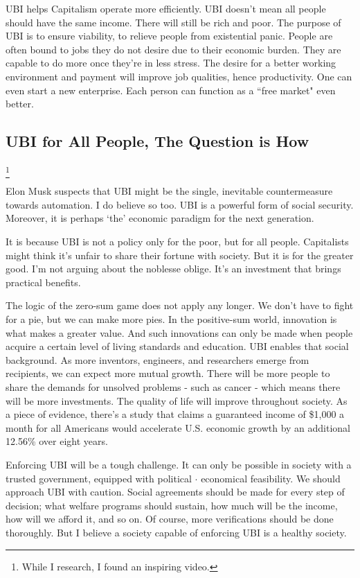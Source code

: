 \documentclass[10pt,a4paper]{article}
\begin{document}
	UBI helps Capitalism operate more efficiently. UBI doesn't mean all people should have the same income. There will still be rich and poor. The purpose of UBI is to ensure viability, to relieve people from existential panic. People are often bound to jobs they do not desire due to their economic burden. They are capable to do more once they're in less stress. The desire for a better working environment and payment will improve job qualities, hence productivity. One can even start a new enterprise. Each person can function as a ``free market" even better.
	
	\subsection*{UBI for All People, The Question is How}\footnote{While I research, I found an inspiring video.\cite{ego}}
	
	Elon Musk suspects that UBI might be the single, inevitable countermeasure towards automation.\cite{musk} I do believe so too. UBI is a powerful form of social security. Moreover, it is perhaps `the' economic paradigm for the next generation.
	
	It is because UBI is not a policy only for the poor, but for all people. Capitalists might think it's unfair to share their fortune with society. But it is for the greater good. I'm not arguing about the noblesse oblige. It's an investment that brings practical benefits.
	
	The logic of the zero-sum game does not apply any longer. We don't have to fight for a pie, but we can make more pies. In the positive-sum world, innovation is what makes a greater value. And such innovations can only be made when people acquire a certain level of living standards and education. UBI enables that social background. As more inventors, engineers, and researchers emerge from recipients, we can expect more mutual growth. There will be more people to share the demands for unsolved problems - such as cancer - which means there will be more investments. The quality of life will improve throughout society. As a piece of evidence, there's a study that claims a guaranteed income of \$1,000 a month for all Americans would accelerate U.S. economic growth by an additional 12.56\% over eight years.\cite{fortune}
	
	Enforcing UBI will be a tough challenge. It can only be possible in society with a trusted government, equipped with political $\cdot$ economical feasibility. We should approach UBI with caution. Social agreements should be made for every step of decision; what welfare programs should sustain, how much will be the income, how will we afford it, and so on.  Of course, more verifications should be done thoroughly. But I believe a society capable of enforcing UBI is a healthy society. 
	
\end{document}
